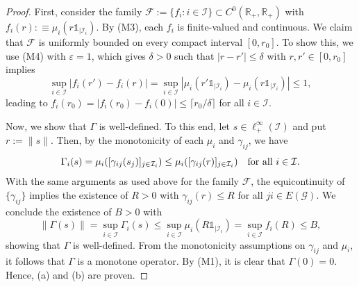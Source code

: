 \documentclass[10pt, oneside, a4paper]{article}
\newcommand{\R}{\mathbb{R}}
\newcommand{\ep}{\varepsilon}
\newcommand{\unit}{\mathds{1}}
\newcommand{\FC}{\mathcal{F}}
\newcommand{\GC}{\mathcal{G}}
\newcommand{\IC}{\mathcal{I}}
\begin{document}
\begin{proof}
First, consider the family $\FC := \{ f_i : i \in \IC \} \subset C^0(\R_+,\R_+)$ with $f_i(r) :\equiv \mu_i(r\unit_{|\IC_i})$. By (M3), each $f_i$ is finite-valued and continuous. We claim that $\FC$ is uniformly bounded on every compact interval $[0,r_0]$. To show this, we use (M4) with $\ep = 1$, which gives $\delta > 0$ such that $|r - r'| \leq \delta$ with $r,r' \in [0,r_0]$ implies%
\begin{equation*}
  \sup_{i \in \IC}|f_i(r') - f_i(r)| = \sup_{i \in \IC}\left|\mu_i\left(r'\unit_{|\IC_i}\right) - \mu_i\left(r\unit_{|\IC_i}\right)\right| \leq 1,%
\end{equation*}
leading to $f_i(r_0) = |f_i(r_0) - f_i(0)| \leq \lceil r_0/\delta \rceil$ for all $i \in \IC$.%

Now, we show that $\Gamma$ is well-defined. To this end, let $s \in \ell^{\infty}_+(\IC)$ and put $r := \|s\|$. Then, by the monotonicity of each $\mu_i$ and $\gamma_{ij}$, we have%
\begin{equation*}
  \Gamma_i(s) = \mu_i( [\gamma_{ij}(s_j)]_{j\in\IC_i} ) \leq \mu_i( [\gamma_{ij}(r)]_{j\in\IC_i} ) \mbox{\quad for all\ } i \in \IC.%
\end{equation*}
With the same arguments as used above for the family $\FC$, the equicontinuity of $\{\gamma_{ij}\}$ implies the existence of $R > 0$ with $\gamma_{ij}(r) \leq R$ for all $ji \in E(\GC)$. We conclude the existence of $B > 0$ with%
\begin{equation*}
  \|\Gamma(s)\| = \sup_{i\in\IC}\Gamma_i(s) \leq \sup_{i\in\IC} \mu_i\left( R\unit_{|\IC_i} \right) = \sup_{i\in\IC} f_i(R) \leq B,%
\end{equation*}
showing that $\Gamma$ is well-defined. From the monotonicity assumptions on $\gamma_{ij}$ and $\mu_i$, it follows that $\Gamma$ is a monotone operator. By (M1), it is clear that $\Gamma(0) = 0$. Hence, (a) and (b) are proven.%


\end{proof}
\end{document}
